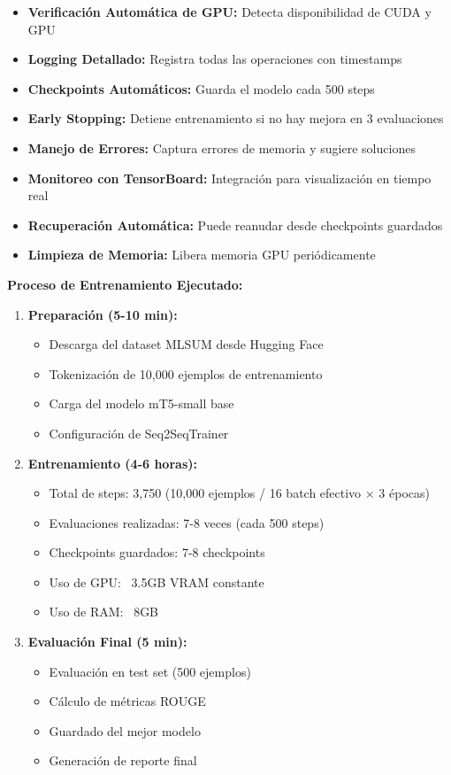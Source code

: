\documentclass[12pt,a4paper]{article}
\begin{document}
\begin{itemize}
    \item \textbf{Verificación Automática de GPU:} Detecta disponibilidad de CUDA y GPU
    \item \textbf{Logging Detallado:} Registra todas las operaciones con timestamps
    \item \textbf{Checkpoints Automáticos:} Guarda el modelo cada 500 steps
    \item \textbf{Early Stopping:} Detiene entrenamiento si no hay mejora en 3 evaluaciones
    \item \textbf{Manejo de Errores:} Captura errores de memoria y sugiere soluciones
    \item \textbf{Monitoreo con TensorBoard:} Integración para visualización en tiempo real
    \item \textbf{Recuperación Automática:} Puede reanudar desde checkpoints guardados
    \item \textbf{Limpieza de Memoria:} Libera memoria GPU periódicamente
\end{itemize}

\textbf{Proceso de Entrenamiento Ejecutado:}

\begin{enumerate}
    \item \textbf{Preparación (5-10 min):}
    \begin{itemize}
        \item Descarga del dataset MLSUM desde Hugging Face
        \item Tokenización de 10,000 ejemplos de entrenamiento
        \item Carga del modelo mT5-small base
        \item Configuración de Seq2SeqTrainer
    \end{itemize}
    
    \item \textbf{Entrenamiento (4-6 horas):}
    \begin{itemize}
        \item Total de steps: 3,750 (10,000 ejemplos / 16 batch efectivo × 3 épocas)
        \item Evaluaciones realizadas: 7-8 veces (cada 500 steps)
        \item Checkpoints guardados: 7-8 checkpoints
        \item Uso de GPU: ~3.5GB VRAM constante
        \item Uso de RAM: ~8GB
    \end{itemize}
    
    \item \textbf{Evaluación Final (5 min):}
    \begin{itemize}
        \item Evaluación en test set (500 ejemplos)
        \item Cálculo de métricas ROUGE
        \item Guardado del mejor modelo
        \item Generación de reporte final
    \end{itemize}
\end{enumerate}
\end{document}
